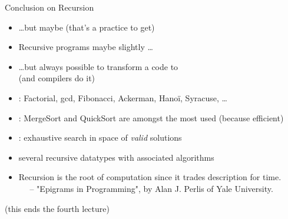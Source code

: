 \begin{frame}{Conclusion on Recursion}
\begin{itemize}
  \item[] \ldots but maybe 
    {\small(that's a practice to get)} \medskip

  \item Recursive programs maybe slightly \ldots
  \item[] \ldots but always possible to transform a code to
    \\  
    {\small (and compilers do it)} \medskip

  \item {}: Factorial, gcd, Fibonacci,
    Ackerman, Hanoï, Syracuse, \ldots\medskip

  \item {}: MergeSort and QuickSort are
    amongst the most used (because efficient)\medskip


  \item {}: exhaustive search in space of \textit{valid}
    solutions\medskip

  \item {} several recursive datatypes
    with associated algorithms

  \item Recursion is the root of computation since it trades description for
    time.\\  
  ~~ -- "Epigrams in Programming", by Alan J. Perlis of Yale University.
  \end{itemize}

  \begin{flushright}
    (this ends the fourth lecture)    
  \end{flushright}
\end{frame}




